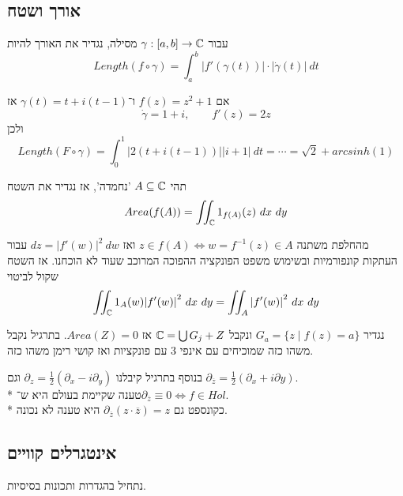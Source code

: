 \subsection{אורך ושטח}
\begin{definition}
	עבור $\gamma : [a, b] \to \mathbb{C}$ מסילה, נגדיר את האורך להיות
	\[
		Length(f \circ \gamma) = \int_{a}^{b} |f'(\gamma(t))| \cdot |\dot{\gamma}(t)|\ dt
	\]
\end{definition}
\begin{example}
	אם $f(z) = z^2 + 1$ ו־$\gamma(t) = t + i(t - 1)$ אז
	\[
		\dot{\gamma} = 1 + i,
		\qquad
		f'(z) = 2z
	\]
	ולכן
	\[
		Length(F \circ \gamma) = \int_0^1 |2(t + i(t - 1))| |i + 1|\ dt
		= \cdots = \sqrt{2} + arcsinh(1)
	\]
\end{example}
\begin{definition}
	תהי $A \subseteq \mathbb{C}$ 'נחמדה', אז נגדיר את השטח
	\[
		Area(f(A)) = \iint_{\mathbb{C}} 1_{f(A)}(z)\ dx\ dy
	\]
\end{definition}
מהחלפת משתנה $z \in f(A) \iff w = f^{-1}(z) \in A$ ואז $dz = {|f'(w)|}^2\ dw$ עבור העתקות קונפורמיות ובשימוש משפט הפונקציה ההפוכה המרוכב שעוד לא הוכחנו. אז השטח שקול לביטוי
\[
	\iint_{\mathbb{C}} 1_A(w) {|f'(w)|}^2\ dx\ dy
	= \iint_A {|f'(w)|}^2\ dx\ dy
\]
\begin{proposition}
	נגדיר $G_a = \{z \mid f(z) = a\}$ ונקבל $\mathbb{C} = \bigcup G_j + Z$ אז $Area(Z) = 0$.
	בתרגיל נקבל משהו כזה שמוכיחים עם אינפי 3 עם פונקציות ואז קושי רימן משהו כזה.
\end{proposition}
בנוסף בתרגיל קיבלנו $\partial_z = \frac{1}{2}(\partial_x - i \partial_y)$ וגם $\partial_{\overline{z}} = \frac{1}{2}(\partial_x + i \partial y)$. \\*
טענה שקיימת בעולם היא ש־$\partial_{\overline{z}} \equiv 0 \iff f \in Hol$. \\*
כקונספט גם $\partial_{\overline{z}} (z \cdot \overline{z}) = z$ היא טענה לא נכונה.

\subsection{אינטגרלים קוויים}
נתחיל בהגדרות ותכונות בסיסיות.

